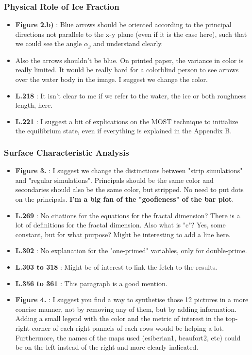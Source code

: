 \documentclass[10pt]{article}
\numberwithin{equation}{section}
\begin{document}
\subsubsection{Physical Role of Ice Fraction}
\label{sec:org4bd44eb}
\begin{itemize}
\item \textbf{Figure 2.b)} : Blue arrows should be oriented according to the principal directions not parallele to the x-y plane (even if it is the case here), such that we could see the angle \(\alpha_g\) and understand clearly.
\item Also the arrows shouldn't be blue. On printed paper, the variance in color is really limited. It would be really hard for a colorblind person to see arrows over the water body in the image. I suggest we change the color.
\item \textbf{L.218} : It isn't clear to me if we refer to the water, the ice or both roughness length, here.
\item \textbf{L.221} : I suggest a bit of explications on the MOST technique to initialize the equilibrium state, even if everything is explained in the Appendix B.
\end{itemize}
\subsubsection{Surface Characteristic Analysis}
\label{sec:orgfbe7251}
\begin{itemize}
\item \textbf{Figure 3.} : I suggest we change the distinctions between "strip simulations" and "regular simulations". Principals should be the same color and secondaries should also be the same color, but stripped. No need to put dots on the principals. \textbf{I'm a big fan of the "goofieness" of the bar plot}.
\item \textbf{L.269} : No citations for the equations for the fractal dimension? There is a lot of definitions for the fractal dimension. Also what is "c"? Yes, some constant, but for what purpose? Might be interesting to add a line here.
\item \textbf{L.302} : No explanation for the "one-primed" variables, only for double-prime.
\item \textbf{L.303 to 318} : Might be of interest to link the fetch to the results.
\item \textbf{L.356 to 361} : This paragraph is a good mention.
\item \textbf{Figure 4.} : I suggest you find a way to synthetise those 12 pictures in a more concise manner, not by removing any of them, but by adding information. Adding a small legend with the color and the metric of interest in the top-right corner of each right pannels of each rows would be helping a lot. Furthermore, the names of the maps used (esiberian1, beaufort2, etc)  could be on the left instead of the right and more clearly indicated.
\end{itemize}
\end{document}
